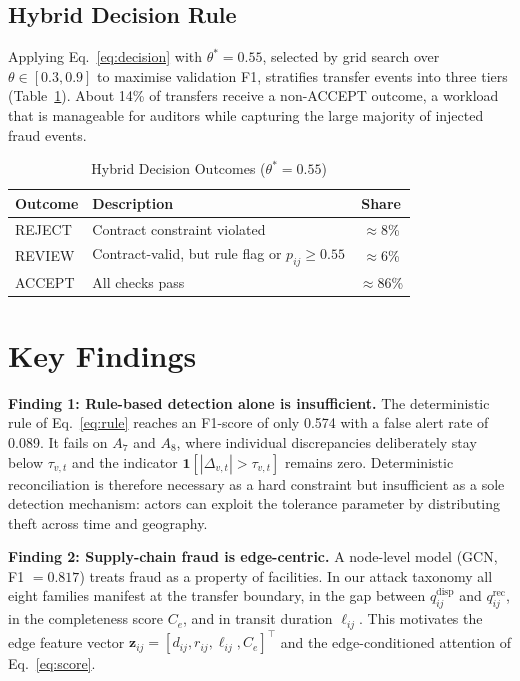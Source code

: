 \documentclass[conference,a4paper]{IEEEtran}
\newcommand{\ind}{\mathbf{1}}
\newcommand{\qdisp}{q^{\mathrm{disp}}}
\newcommand{\qrec}{q^{\mathrm{rec}}}
\begin{document}
\subsection{Hybrid Decision Rule}
Applying Eq.~\eqref{eq:decision} with $\theta^{*}=0.55$, selected by grid search over $\theta\in[0.3,0.9]$ to maximise validation F1, stratifies transfer events into three tiers (Table~\ref{tab:hybrid}). About 14\% of transfers receive a non-ACCEPT outcome, a workload that is manageable for auditors while capturing the large majority of injected fraud events.

\begin{table}[!t]
\caption{Hybrid Decision Outcomes ($\theta^{*}=0.55$)}
\label{tab:hybrid}
\centering\footnotesize
\begin{tabularx}{\columnwidth}{@{}l X c@{}}
\toprule
Outcome & Description & Share\\
\midrule
REJECT & Contract constraint violated & $\approx$8\%\\
REVIEW & Contract-valid, but rule flag or $p_{ij}\ge0.55$ & $\approx$6\%\\
ACCEPT & All checks pass & $\approx$86\%\\
\bottomrule
\end{tabularx}
\end{table}

\section{Key Findings}
\label{sec:findings}
\textbf{Finding 1: Rule-based detection alone is insufficient.} The deterministic rule of Eq.~\eqref{eq:rule} reaches an F1-score of only 0.574 with a false alert rate of 0.089. It fails on $A_7$ and $A_8$, where individual discrepancies deliberately stay below $\tau_{v,t}$ and the indicator $\ind[|\Delta_{v,t}|>\tau_{v,t}]$ remains zero. Deterministic reconciliation is therefore necessary as a hard constraint but insufficient as a sole detection mechanism: actors can exploit the tolerance parameter by distributing theft across time and geography.

\textbf{Finding 2: Supply-chain fraud is edge-centric.} A node-level model (GCN, F1 $=0.817$) treats fraud as a property of facilities. In our attack taxonomy all eight families manifest at the transfer boundary, in the gap between $\qdisp_{ij}$ and $\qrec_{ij}$, in the completeness score $C_e$, and in transit duration $\ell_{ij}$. This motivates the edge feature vector $\mathbf z_{ij}=[d_{ij},r_{ij},\ell_{ij},C_e]^{\top}$ and the edge-conditioned attention of Eq.~\eqref{eq:score}.
\end{document}
